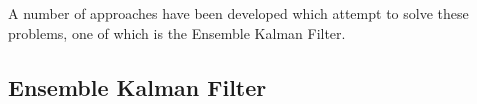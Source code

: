 A number of approaches have been developed which attempt to solve these
problems, one of which is the Ensemble Kalman Filter.




\subsection{Ensemble Kalman Filter}\label{sub:method:enkf}


